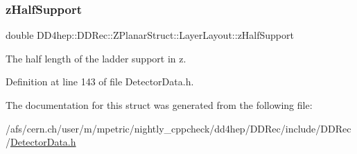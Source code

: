 \hypertarget{struct_d_d4hep_1_1_d_d_rec_1_1_z_planar_struct_1_1_layer_layout_abc36f1593bf58e3ccae337babd8be4d5}{}\label{struct_d_d4hep_1_1_d_d_rec_1_1_z_planar_struct_1_1_layer_layout_abc36f1593bf58e3ccae337babd8be4d5} 
\subsubsection{\texorpdfstring{z\+Half\+Support}{zHalfSupport}}
{\footnotesize\ttfamily double D\+D4hep\+::\+D\+D\+Rec\+::\+Z\+Planar\+Struct\+::\+Layer\+Layout\+::z\+Half\+Support}



The half length of the ladder support in z. 



Definition at line 143 of file Detector\+Data.\+h.



The documentation for this struct was generated from the following file\+:\begin{DoxyCompactItemize}
\item 
/afs/cern.\+ch/user/m/mpetric/nightly\+\_\+cppcheck/dd4hep/\+D\+D\+Rec/include/\+D\+D\+Rec/\hyperlink{_detector_data_8h}{Detector\+Data.\+h}\end{DoxyCompactItemize}
